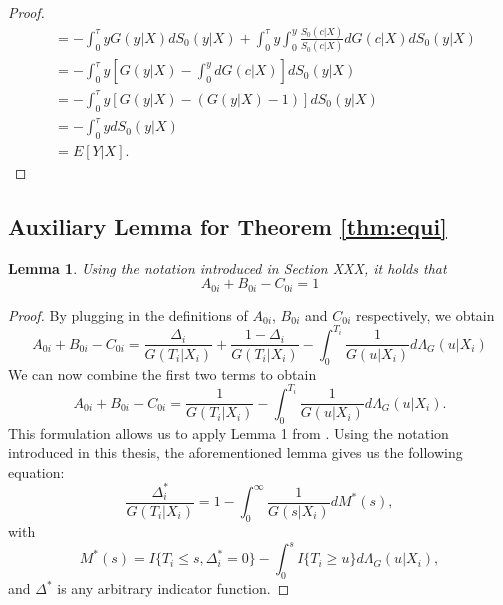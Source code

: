 \documentclass[12pt, a4paper]{scrartcl}
\theoremstyle{definition}
\theoremstyle{plain}
\newtheorem{Lemma}{Lemma}[section]
\numberwithin{equation}{section}
\numberwithin{figure}{section}
\numberwithin{table}{section}
\begin{document}
\begin{appendices}
\begin{proof}
\begin{equation*}
\begin{split}
			&= - \int_{0}^{\tau} y G(y\vert X)dS_0(y\vert X) + \int_0^{\tau}y\int_0^y \frac{S_0(c\vert X)}{S_0(c\vert X)} dG(c\vert X)dS_0(y\vert X)\\
			&= - \int_{0}^{\tau} y \left[G(y\vert X)-\int_0^ydG(c\vert X)\right]dS_0(y\vert X)\\
			&= - \int_{0}^{\tau} y \left[G(y\vert X)-(G(y\vert X)-1)\right]dS_0(y\vert X)\\
			&= - \int_{0}^{\tau} ydS_0(y\vert X)\\
			&= E[Y\vert X].
			\end{split}
			\end{equation*}
		\end{proof}
		\subsection{Auxiliary Lemma for Theorem \ref{thm:equi}}\label{proof:strawderman}
		
		\begin{Lemma}\label{lem:equi}
			Using the notation introduced in Section XXX, it holds that 
			\begin{equation*}
				A_{0i}+B_{0i}-C_{0i}=1
			\end{equation*}
		\end{Lemma}
		\begin{proof}
			By plugging in the definitions of $A_{0i}$, $B_{0i}$ and $C_{0i}$ respectively, we obtain
			\begin{equation*}
			A_{0i}+B_{0i}-C_{0i} = \frac{\Delta_i}{G(T_i\vert X_i)} + \frac{1-\Delta_i}{G(T_i\vert X_i)} - \int_{0}^{T_i}\frac{1}{G(u\vert X_i)}d\Lambda_G(u\vert X_i)
			\end{equation*}
			We can now combine the first two terms to obtain
			\begin{equation}\label{eq:lemma}
			A_{0i}+B_{0i}-C_{0i} = \frac{1}{G(T_i \vert X_i)} - \int_{0}^{T_i}\frac{1}{G(u\vert X_i)}d\Lambda_G(u\vert X_i).
			\end{equation}
			This formulation allows us to apply Lemma 1 from \citet*{strawderman}.
			Using the notation introduced in this thesis, the aforementioned lemma gives us the following equation:
			\begin{equation}\label{eq:straw}
			\frac{\Delta^*_i}{G(T_i\vert X_i)} = 1 - \int_{0}^{\infty} \frac{1}{G(s\vert X_i)} dM^*(s),
			\end{equation}
			with
			\begin{equation*}
			M^*(s) = I\{T_i \leq s, \Delta^*_i=0\} - \int_{0}^s I\{T_i\geq u\}d\Lambda_G(u\vert X_i),
			\end{equation*}
			and $\Delta^*$ is any arbitrary indicator function.
			

\end{proof}
\end{appendices}
\end{document}
